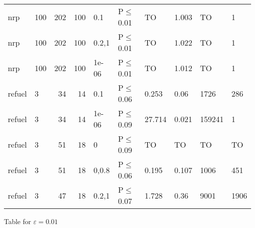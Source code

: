 \begin{longtable}{llrrllllll}
 nrp           & 100       &    	202 &  100 & 0.1   & P$\leq$0.01  & TO       & 1.003    & TO      & 1       \\
 nrp           & 100       &    	202 &  100 & 0.2,1 & P$\leq$0.01  & TO       & 1.022    & TO      & 1       \\
 nrp           & 100       &    	202 &  100 & 1e-06 & P$\leq$0.01  & TO       & 1.012    & TO      & 1       \\
 refuel        & 3         &     	34 &   14 & 0.1   & P$\leq$0.06  & 0.253    & 0.06     & 1726    & 286     \\
 refuel        & 3         &     	34 &   14 & 1e-06 & P$\leq$0.09  & 27.714   & 0.021    & 159241  & 1       \\
 refuel        & 3         &     	51 &   18 & 0     & P$\leq$0.09  & TO       & TO       & TO      & TO      \\
 refuel        & 3         &     	51 &   18 & 0,0.8 & P$\leq$0.06  & 0.195    & 0.107    & 1006    & 451     \\
 refuel        & 3         &     	47 &   18 & 0.2,1 & P$\leq$0.07  & 1.728    & 0.36     & 9001    & 1906    \\
\bottomrule
\end{longtable}
\small Table for \(\varepsilon=0.01\)
